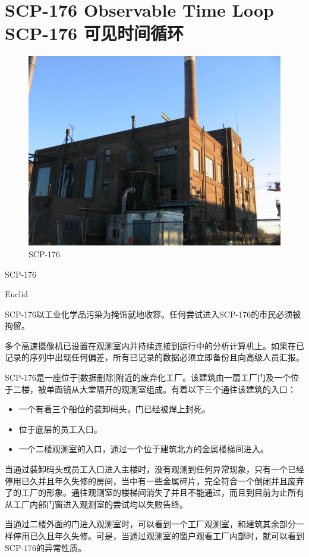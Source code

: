 \chapter[SCP-176 可见时间循环]{
    SCP-176 Observable Time Loop\\
    SCP-176 可见时间循环
}

\label{chap:SCP-176}

\begin{figure}[H]
    \centering
    \includegraphics[width=0.5\linewidth]{images/SCP-176.jpg}
    \caption*{SCP-176}
\end{figure}

SCP-176

Euclid

SCP-176以工业化学品污染为掩饰就地收容。任何尝试进入SCP-176的市民必须被拘留。

多个高速摄像机已设置在观测室内并持续连接到运行中的分析计算机上。如果在已记录的序列中出现任何偏差，所有已记录的数据必须立即备份且向高级人员汇报。

SCP-176是一座位于{[}数据删除]附近的废弃化工厂。该建筑由一扇工厂门及一个位于二楼，被单面镜从大堂隔开的观测室组成。有着以下三个通往该建筑的入口：

\begin{itemize}
\item 一个有着三个船位的装卸码头，门已经被焊上封死。
\item 位于底层的员工入口。
\item 一个二楼观测室的入口，通过一个位于建筑北方的金属楼梯间进入。
\end{itemize}

当通过装卸码头或员工入口进入主楼时，没有观测到任何异常现象，只有一个已经停用已久并且年久失修的房间，当中有一些金属碎片，完全符合一个倒闭并且废弃了的工厂的形象。通往观测室的楼梯间消失了并且不能通过，而且到目前为止所有从工厂内部门窗进入观测室的尝试均以失败告终。

当通过二楼外面的门进入观测室时，可以看到一个工厂观测室，和建筑其余部分一样停用已久且年久失修。可是，当通过观测室的窗户观看工厂内部时，就可以看到SCP-176的异常性质。

